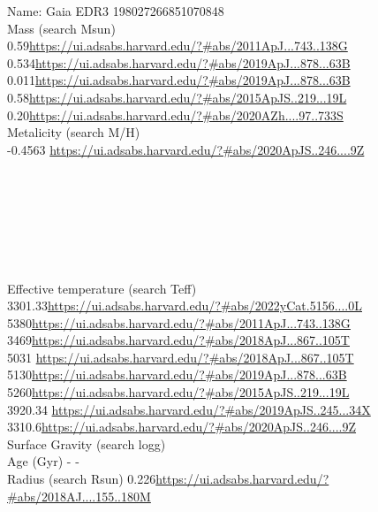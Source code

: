 Name: Gaia EDR3 198027266851070848 \\
Mass (search Msun)\\
0.59\url{https://ui.adsabs.harvard.edu/?#abs/2011ApJ...743..138G}\\
0.534\url{https://ui.adsabs.harvard.edu/?#abs/2019ApJ...878...63B}\\
0.011\url{https://ui.adsabs.harvard.edu/?#abs/2019ApJ...878...63B}\\
0.58\url{https://ui.adsabs.harvard.edu/?#abs/2015ApJS..219...19L}\\
0.20\url{https://ui.adsabs.harvard.edu/?#abs/2020AZh....97..733S}\\

Metalicity (search M/H)\\
-0.4563	\url{https://ui.adsabs.harvard.edu/?#abs/2020ApJS..246....9Z}\\

\url{}\\
\url{}\\
\url{}\\
\url{}\\
\url{}\\
\url{}\\
\url{}\\
Effective temperature (search Teff) \\ 3301.33\url{https://ui.adsabs.harvard.edu/?#abs/2022yCat.5156....0L}\\
5380\url{https://ui.adsabs.harvard.edu/?#abs/2011ApJ...743..138G}\\
3469\url{https://ui.adsabs.harvard.edu/?#abs/2018ApJ...867..105T}\\
5031	\url{https://ui.adsabs.harvard.edu/?#abs/2018ApJ...867..105T}\\
5130\url{https://ui.adsabs.harvard.edu/?#abs/2019ApJ...878...63B}\\
5260\url{https://ui.adsabs.harvard.edu/?#abs/2015ApJS..219...19L}\\
3920.34	\url{https://ui.adsabs.harvard.edu/?#abs/2019ApJS..245...34X}\\
3310.6\url{https://ui.adsabs.harvard.edu/?#abs/2020ApJS..246....9Z}\\
Surface Gravity (search logg) \\
Age (Gyr)
- -\\
Radius (search Rsun)
0.226\url{https://ui.adsabs.harvard.edu/?#abs/2018AJ....155..180M}\\